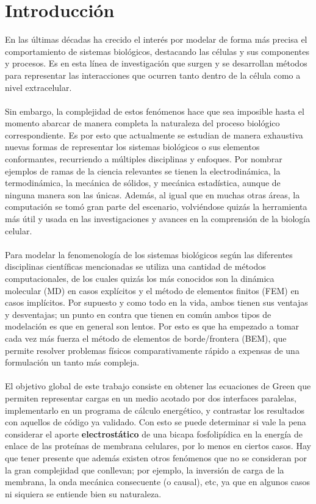 \documentclass[12pt, notitlepage]{article}
\numberwithin{equation}{section}
\begin{document}
\section{Introducción}
En las últimas décadas ha crecido el interés por modelar de forma más precisa el comportamiento de sistemas biológicos, destacando las células y sus componentes y procesos. Es en esta línea de investigación que surgen y se desarrollan métodos para representar las interacciones que ocurren tanto dentro de la célula como a nivel extracelular.\\\\
Sin embargo, la complejidad de estos fenómenos hace que sea imposible hasta el momento abarcar de manera completa la naturaleza del proceso biológico correspondiente. Es por esto que actualmente se estudian de manera exhaustiva nuevas formas de representar los sistemas biológicos o sus elementos conformantes, recurriendo a múltiples disciplinas y enfoques. Por nombrar ejemplos de ramas de la ciencia relevantes se tienen la electrodinámica, la termodinámica, la mecánica de sólidos, y mecánica estadística, aunque de ninguna manera son las únicas. Además, al igual que en muchas otras áreas, la computación se tomó gran parte del escenario, volviéndose quizás la herramienta más útil y usada en las investigaciones y avances en la comprensión de la biología celular.\\\\
Para modelar la fenomenología de los sistemas biológicos según las diferentes disciplinas científicas mencionadas se utiliza una cantidad de métodos computacionales, de los cuales quizás los más conocidos son la dinámica molecular (MD) en casos explícitos y el método de elementos finitos (FEM) en casos implícitos. Por supuesto y como todo en la vida, ambos tienen sus ventajas y desventajas; un punto en contra que tienen en común ambos tipos de modelación es que en general son lentos. Por esto es que ha empezado a tomar cada vez más fuerza el método de elementos de borde/frontera (BEM), que permite resolver problemas físicos comparativamente rápido a expensas de una formulación un tanto más compleja.\\\\
El objetivo global de este trabajo consiste en obtener las ecuaciones de Green que permiten representar cargas en un medio acotado por dos interfaces paralelas, implementarlo en un programa de cálculo energético, y contrastar los resultados con aquellos de código ya validado. Con esto se puede determinar si vale la pena considerar el aporte \textbf{electrostático} de una bicapa fosfolipídica en la energía de enlace de las proteínas de membrana celulares, por lo menos en ciertos casos. Hay que tener presente que además existen otros fenómenos que no se consideran por la gran complejidad que conllevan; por ejemplo, la inversión de carga de la membrana, la onda mecánica consecuente (o causal), etc, ya que en algunos casos ni siquiera se entiende bien su naturaleza.\\\\
\end{document}
